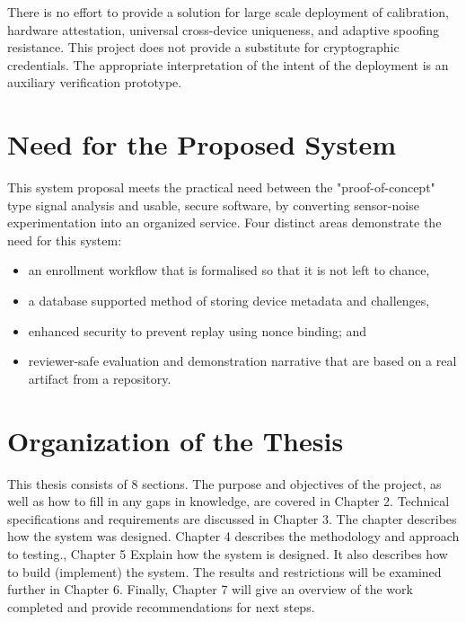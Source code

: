 There is no effort to provide a solution for large scale deployment of calibration, hardware attestation, universal cross-device uniqueness, and adaptive spoofing resistance. This project does not provide a substitute for cryptographic credentials. The appropriate interpretation of the intent of the deployment is an auxiliary verification prototype.

\section{Need for the Proposed System}
This system proposal meets the practical need between the "proof-of-concept" type signal analysis and usable, secure software, by converting sensor-noise experimentation into an organized service. Four distinct areas demonstrate the need for this system:
\begin{itemize}
	\item an enrollment workflow that is formalised so that it is not left to chance,
	\item a database supported method of storing device metadata and challenges,
	\item enhanced security to prevent replay using nonce binding; and
	\item reviewer-safe evaluation and demonstration narrative that are based on a real artifact from a repository.
\end{itemize}

\section{Organization of the Thesis}
This thesis consists of 8 sections. The purpose and objectives of the project, as well as how to fill in any gaps in knowledge, are covered in Chapter 2. Technical specifications and requirements are discussed in Chapter 3. The chapter describes how the system was designed. Chapter 4 describes the methodology and approach to testing., Chapter 5 Explain how the system is designed. It also describes how to build (implement) the system. The results and restrictions will be examined further in Chapter 6. Finally, Chapter 7 will give an overview of the work completed and provide recommendations for next steps.